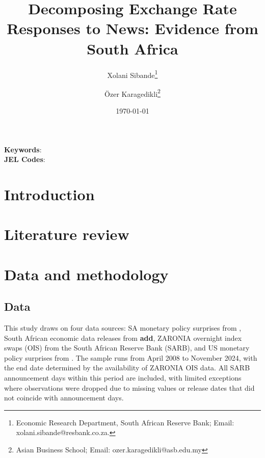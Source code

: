 \documentclass[
  letterpaper,
  DIV=11,
  numbers=noendperiod]{scrartcl}
\author{}
\date{}
\begin{document}
\title{Decomposing Exchange Rate Responses to News: Evidence from South Africa}





\author {Xolani Sibande\footnote{Economic Research Department, South African Reserve Bank; Email: xolani.sibande@resbank.co.za.} \and
{\"Ozer Karagedikli\footnote{Asian Business School; Email: ozer.karagedikli@asb.edu.my}}}


\date{\today}
\maketitle

\begin{abstract}


\end{abstract}

\noindent\textbf{Keywords}: \\
\textbf{JEL Codes}: 
\newpage

\section{Introduction}\label{introduction}

\citet{coleman2012}

\section{Literature review}\label{literature-review}

\section{Data and methodology}\label{data-and-methodology}

\subsection{Data}\label{data}

This study draws on four data sources: SA monetary policy surprises from
\citet{pirozhkova2024a}, South African economic data releases from
\textbf{add}, ZARONIA overnight index swaps (OIS) from the South African
Reserve Bank (SARB), and US monetary policy surprises from
\citet{jarocinski2024a}. The sample runs from April 2008 to November
2024, with the end date determined by the availability of ZARONIA OIS
data. All SARB announcement days within this period are included, with
limited exceptions where observations were dropped due to missing values
or release dates that did not coincide with announcement days.
\end{document}
